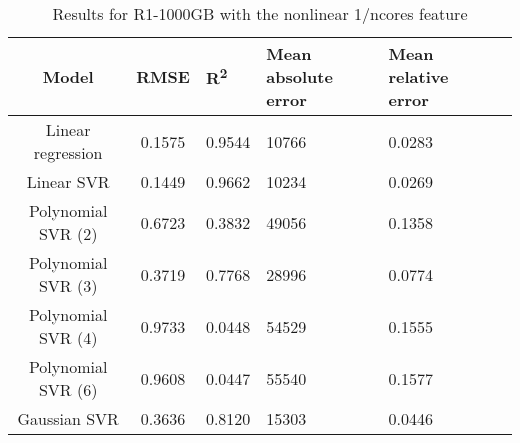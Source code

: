 \begin{table}[H]
\centering
\begin{adjustbox}{center}
\begin{tabular}{c | c M{1.2cm} M{2.5cm} M{2.5cm} M{1.8cm}}
Model & RMSE & R\textsuperscript{2} & Mean absolute error & Mean relative error \tabularnewline
\hline
Linear regression & 0.1575 & 0.9544 &  10766 & 0.0283 \\
Linear SVR & 0.1449 & 0.9662 &  10234 & 0.0269 \\
Polynomial SVR (2) & 0.6723 & 0.3832 &  49056 & 0.1358 \\
Polynomial SVR (3) & 0.3719 & 0.7768 &  28996 & 0.0774 \\
Polynomial SVR (4) & 0.9733 & 0.0448 &  54529 & 0.1555 \\
Polynomial SVR (6) & 0.9608 & 0.0447 &  55540 & 0.1577 \\
Gaussian SVR & 0.3636 & 0.8120 &  15303 & 0.0446 \\
\end{tabular}
\end{adjustbox}
\\
\caption{Results for R1-1000GB with the nonlinear 1/ncores feature}
\label{tab:all_nonlinear_R1_1000}
\end{table}
